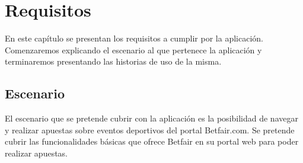\chapter{Requisitos}
\label{ch:requisitos}
En este capítulo se presentan los requisitos a cumplir por la aplicación. Comenzaremos explicando el escenario al que pertenece la aplicación y terminaremos presentando las historias de uso de la misma.
\section{Escenario}

El escenario que se pretende %
cubrir con la aplicación es la posibilidad de navegar y realizar apuestas sobre eventos deportivos del portal Betfair.com. Se pretende cubrir las funcionalidades básicas que ofrece Betfair en su portal web para poder realizar apuestas. %






